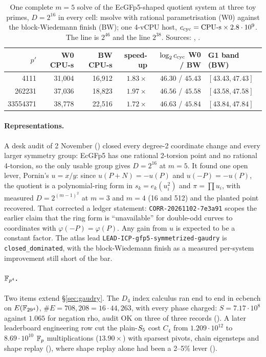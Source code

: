 \begin{table}[t]
\centering\small
\begin{tabular}{@{}rrrrrl@{}}
\toprule
$p'$ & W0 CPU-s & BW CPU-s & speed-up & $\log_2c_{\rm cyc}$ W0 / BW & G1 band (BW) \\
\midrule
4111 & 31{,}004 & 16{,}912 & $1.83\times$ & $46.30$ / $45.43$ & $[43.43,47.43]$ \\
262231 & 37{,}036 & 18{,}823 & $1.97\times$ & $46.56$ / $45.58$ & $[43.58,47.58]$ \\
33554371 & 38{,}778 & 22{,}516 & $1.72\times$ & $46.63$ / $45.84$ & $[43.84,47.84]$ \\
\bottomrule
\end{tabular}
\caption[]{One complete $m=5$ solve of the EcGFp5-shaped quotient system at
three toy primes, $D=2^{16}$ in every cell: msolve with rational
parametrisation (W0) against the block-Wiedemann finish (BW); one 4-vCPU
host, $c_{\rm cyc}=\text{CPU-s}\times2.8\cdot10^9$. The  line is
$2^{46}$ and the  line $2^{38}$. Sources:
,
.}
\label{tab:pt-gfp5}
\end{table}

\paragraph{Representations.} A desk audit of 2 November
() closed every
degree-2 coordinate change and every larger symmetry group: EcGFp5 has one
rational 2-torsion point and no rational 4-torsion, so the only usable group
gives $D=2^{16}$ at $m=5$. It found one open lever, Pornin's $u=x/y$: since
$u(P+N)=-u(P)$ and $u(-P)=-u(P)$, the quotient is a polynomial-ring form in
$s_k=e_k(u_i^2)$ and $\pi=\prod u_i$, with measured $D=2^{(m-1)^2}$ at $m=3$
and $m=4$ (16 and 512) and the planted point recovered. That corrected a
ledger statement: \texttt{CORR-20261102-7e3a91} scopes the earlier claim that
the ring form is ``unavailable'' for double-odd curves to coordinates with
$\varphi(-P)=\varphi(P)$. Any gain from $u$ is expected to be a constant
factor. The atlas lead \texttt{LEAD-ICP-gfp5-symmetrized-gaudry} is
\texttt{closed\_dominated}, with the block-Wiedemann
finish as a measured per-system improvement still short of the
 bar.

\paragraph{$\mathbb{F}_{p^4}$.} Two items extend \S\ref{sec:gaudry}. The $D_4$
index calculus ran end to end in ecbench on $E(\mathbb{F}_{29^4})$,
$\#E=708{,}208=16\cdot44{,}263$, with every phase charged: $S=7.17\cdot10^8$
against $1.065$ for negation rho, audit OK on three of three records
(). A later leaderboard
engineering row cut the plain-$S_{5}$ cost $C_4$ from $1.209\cdot10^{12}$ to
$8.69\cdot10^{10}$ $\mathbb{F}_p$ multiplications ($13.90\times$) with sparsest
pivots, chain eigensteps and shape replay
(), where shape replay alone
had been a 2--5\% lever ().


